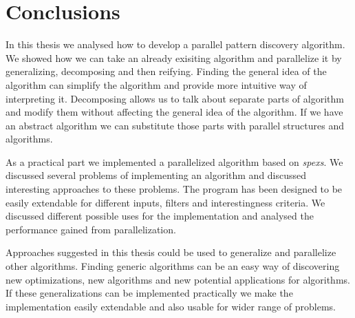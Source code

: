 \chapter{Conclusions}
\label{c:conclusions}

In this thesis we analysed how to develop a parallel pattern discovery algorithm. We showed how we can take an already exisiting algorithm and parallelize it by generalizing, decomposing and then reifying. Finding the general idea of the algorithm can simplify the algorithm and provide more intuitive way of interpreting it. Decomposing allows us to talk about separate parts of algorithm and modify them without affecting the general idea of the algorithm. If we have an abstract algorithm we can substitute those parts with parallel structures and algorithms.

As a practical part we implemented a parallelized algorithm based on \emph{spexs}\cite{spexs}. We discussed several problems of implementing an algorithm and discussed interesting approaches to these problems. The program has been designed to be easily extendable for different inputs, filters and interestingness criteria. We discussed different possible uses for the implementation and analysed the performance gained from parallelization.

Approaches suggested in this thesis could be used to generalize and parallelize other algorithms. Finding generic algorithms can be an easy way of discovering new optimizations, new algorithms and new potential applications for algorithms. If these generalizations can be implemented practically we make the implementation easily extendable and also usable for wider range of problems.